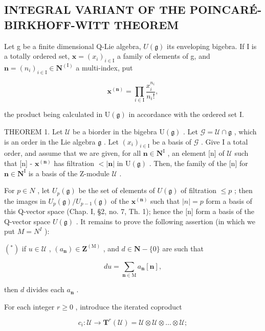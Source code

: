 \subsection{INTEGRAL VARIANT OF THE POINCAR\'E-BIRKHOFF-WITT THEOREM}

Let g be a finite dimensional Q-Lie algebra, \(U(\mathfrak{g})\) its enveloping bigebra. If I is a totally ordered set, \(\mathbf{x} = (x_i)_{i \in \mathrm{I}}\) a family of elements of g, and \(\mathbf{n} = (n_i)_{i \in \mathrm{I}} \in \mathbf{N}^{(\mathrm{I})}\) a multi-index, put

\[
\mathbf {x} ^ {(\mathbf {n})} = \prod_ {i \in \mathrm{I}} \frac {x _ {i} ^ {n _ {i}}}{n _ {i} !},\tag{5}
\]

the product being calculated in \(\mathrm{U}(\mathfrak{g})\) in accordance with the ordered set I.

THEOREM 1. Let \(\mathcal{U}\) be a biorder in the bigebra \(\mathrm{U}(\mathfrak{g})\) . Let \(\mathcal{G} = \mathcal{U} \cap \mathfrak{g}\) , which is an order in the Lie algebra \(\mathfrak{g}\) . Let \((x_i)_{i \in \mathrm{I}}\) be a basis of \(\mathcal{G}\) . Give I a total order, and assume that we are given, for all \(\mathbf{n} \in \mathbf{N}^{\mathrm{I}}\) , an element {[}n{]} of \(\mathcal{U}\) such that {[}n{]} - \(\mathbf{x}^{(\mathbf{n})}\) has filtration \(< |\mathbf{n}|\) in \(\mathrm{U}(\mathfrak{g})\) . Then, the family of the {[}n{]} for \(\mathbf{n} \in \mathbf{N}^{\mathrm{I}}\) is a basis of the Z-module \(\mathcal{U}\) .

For \(p \in N\) , let \(U_{p}(\mathfrak{g})\) be the set of elements of \(U(\mathfrak{g})\) of filtration \(\leq p\) ; then the images in \(U_{p}(\mathfrak{g}) / U_{p-1}(\mathfrak{g})\) of the \(\mathbf{x}^{(\mathbf{n})}\) such that \(|n| = p\) form a basis of this Q-vector space (Chap. I, §2, no. 7, Th. 1); hence the {[}n{]} form a basis of the Q-vector space \(U(\mathfrak{g})\) . It remains to prove the following assertion (in which we put \(M = N^{I}\) ):

\((^{*})\) if \(u\in \mathcal{U}\) , \((a_{\mathbf{n}})\in \mathbf{Z}^{(\mathrm{M})}\) , and \(d\in \mathbf{N} - \{0\}\) are such that

\[
d u = \sum_ {\mathbf {n} \in \mathrm{M}} a _ {\mathbf {n}} [ \mathbf {n} ],\tag{6}
\]

then \(d\) divides each \(a_{\mathbf{n}}\) .

For each integer \(r \geq 0\) , introduce the iterated coproduct

\[
c _ {i}: \mathcal {U} \rightarrow \mathbf {T} ^ {r} (\mathcal {U}) = \mathcal {U} \otimes \mathcal {U} \otimes \dots \otimes \mathcal {U};
\]

